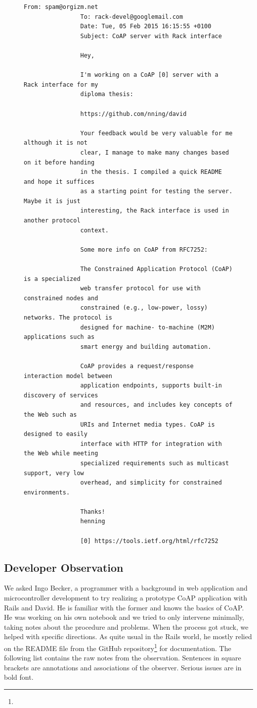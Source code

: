 		\begin{figure}
			\begin{lstlisting}[gobble=8,caption={Announcement of David on mailing lists},label=lst:evaluation:announcement]
				From: spam@orgizm.net
				To: rack-devel@googlemail.com
				Date: Tue, 05 Feb 2015 16:15:55 +0100
				Subject: CoAP server with Rack interface

				Hey,

				I'm working on a CoAP [0] server with a Rack interface for my
				diploma thesis:

				https://github.com/nning/david

				Your feedback would be very valuable for me although it is not
				clear, I manage to make many changes based on it before handing
				in the thesis. I compiled a quick README and hope it suffices
				as a starting point for testing the server. Maybe it is just
				interesting, the Rack interface is used in another protocol
				context.

				Some more info on CoAP from RFC7252:

				The Constrained Application Protocol (CoAP) is a specialized
				web transfer protocol for use with constrained nodes and
				constrained (e.g., low-power, lossy) networks. The protocol is
				designed for machine- to-machine (M2M) applications such as
				smart energy and building automation.

				CoAP provides a request/response interaction model between
				application endpoints, supports built-in discovery of services
				and resources, and includes key concepts of the Web such as
				URIs and Internet media types. CoAP is designed to easily
				interface with HTTP for integration with the Web while meeting
				specialized requirements such as multicast support, very low
				overhead, and simplicity for constrained environments.

				Thanks!
				henning

				[0] https://tools.ietf.org/html/rfc7252
			\end{lstlisting}
		\end{figure}


	\subsection{Developer Observation}
	\label{cha:rawdata:feedback:observation}

		We asked Ingo Becker, a programmer with a background in web application
		and microcontroller development to try realizing a prototype \ac{CoAP}
		application with \ac{Rails} and David. He is familiar with the former
		and knows the basics of \ac{CoAP}. He was working on his own notebook
		and we tried to only intervene minimally, taking notes about the
		procedure and problems. When the process got stuck, we helped with
		specific directions. As quite usual in the \ac{Rails} world, he mostly
		relied on the README file from the GitHub
		repository\footnote{\urlDavid} for documentation. The following list
		contains the raw notes from the observation. Sentences in square
		brackets are annotations and associations of the observer. Serious
		issues are in bold font.

